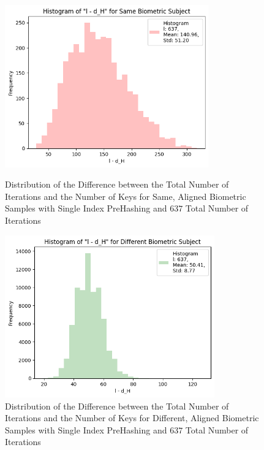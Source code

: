 \begin{enumerate}
\begin{itemize}
            \begin{figure}[H]
                \centering
                \begin{minipage}[b]{0.48\linewidth}
                    \centering
                    \includegraphics[width=\linewidth,height=7cm,keepaspectratio]{latex-img/l-dHconfig1_same.png}
                    \caption{Distribution of the Difference between the Total Number of Iterations and the Number of Keys for Same, Aligned Biometric Samples with Single Index PreHashing and $637$ Total Number of Iterations}
                    \label{l-dHconfig1_same}
                \end{minipage}
                \hfill
                \begin{minipage}[b]{0.48\linewidth}
                    \centering
                    \includegraphics[width=\linewidth,height=7cm,keepaspectratio]{latex-img/l-dHconfig1_diff.png}
                    \caption{Distribution of the Difference between the Total Number of Iterations and the Number of Keys for Different, Aligned Biometric Samples with Single Index PreHashing and $637$ Total Number of Iterations}
                    \label{l-dHconfig1_diff}
                \end{minipage}
            \end{figure}


\end{itemize}
\end{enumerate}
